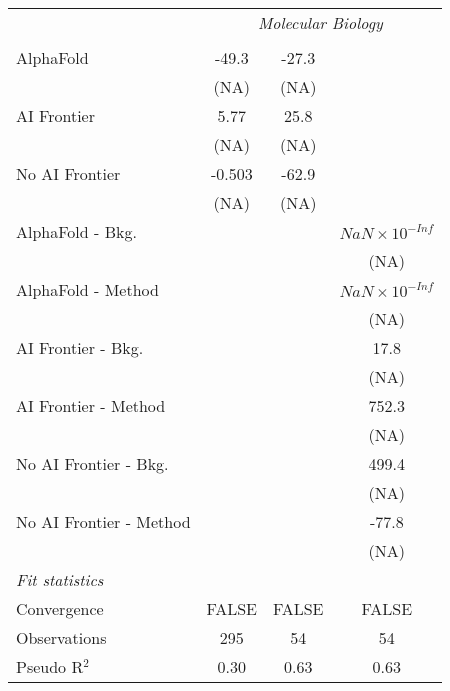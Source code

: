 \begin{tabular}{lccc}
 & \multicolumn{3}{c}{\textit{Molecular Biology}} \\ \\
   AlphaFold               & -49.3  & -27.3 &   \\   
                           & (NA)   & (NA)  &   \\   
   AI Frontier             & 5.77   & 25.8  &   \\   
                           & (NA)   & (NA)  &   \\   
   No AI Frontier          & -0.503 & -62.9 &   \\   
                           & (NA)   & (NA)  &   \\   
   AlphaFold - Bkg.        &        &       & $NaN\times 10^{-Inf}$\\    
                           &        &       & (NA)\\   
   AlphaFold - Method      &        &       & $NaN\times 10^{-Inf}$\\    
                           &        &       & (NA)\\   
   AI Frontier - Bkg.      &        &       & 17.8\\   
                           &        &       & (NA)\\   
   AI Frontier - Method    &        &       & 752.3\\   
                           &        &       & (NA)\\   
   No AI Frontier - Bkg.   &        &       & 499.4\\   
                           &        &       & (NA)\\   
   No AI Frontier - Method &        &       & -77.8\\   
                           &        &       & (NA)\\   
   \midrule
   \emph{Fit statistics}\\
   Convergence             &FALSE   & FALSE & FALSE\\  
   Observations            & 295    & 54    & 54\\  
   Pseudo R$^2$            & 0.30   & 0.63  & 0.63\\  
   

\end{tabular}
